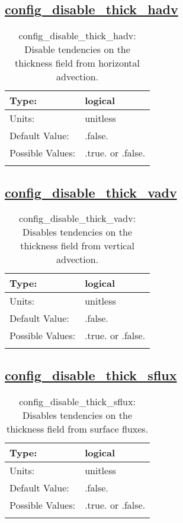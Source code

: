 \subsection[config\_disable\_thick\_hadv]{\hyperref[sec:nm_tab_debug]{config\_disable\_thick\_hadv}}
\label{subsec:nm_sec_config_disable_thick_hadv}
\begin{center}
\begin{longtable}{| p{2.0in} || p{4.0in} |}
    \hline
    Type: & logical \\
    \hline
    Units: & \si{unitless} \\
    \hline
    Default Value: & .false. \\
    \hline
    Possible Values: & .true. or .false. \\
    \hline
    \caption{config\_disable\_thick\_hadv: Disable tendencies on the thickness field from horizontal advection.}
\end{longtable}
\end{center}
\subsection[config\_disable\_thick\_vadv]{\hyperref[sec:nm_tab_debug]{config\_disable\_thick\_vadv}}
\label{subsec:nm_sec_config_disable_thick_vadv}
\begin{center}
\begin{longtable}{| p{2.0in} || p{4.0in} |}
    \hline
    Type: & logical \\
    \hline
    Units: & \si{unitless} \\
    \hline
    Default Value: & .false. \\
    \hline
    Possible Values: & .true. or .false. \\
    \hline
    \caption{config\_disable\_thick\_vadv: Disables tendencies on the thickness field from vertical advection.}
\end{longtable}
\end{center}
\subsection[config\_disable\_thick\_sflux]{\hyperref[sec:nm_tab_debug]{config\_disable\_thick\_sflux}}
\label{subsec:nm_sec_config_disable_thick_sflux}
\begin{center}
\begin{longtable}{| p{2.0in} || p{4.0in} |}
    \hline
    Type: & logical \\
    \hline
    Units: & \si{unitless} \\
    \hline
    Default Value: & .false. \\
    \hline
    Possible Values: & .true. or .false. \\
    \hline
    \caption{config\_disable\_thick\_sflux: Disables tendencies on the thickness field from surface fluxes.}
\end{longtable}
\end{center}
